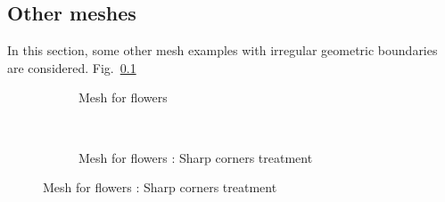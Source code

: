 \subsection{Other meshes}
In this section, some other mesh examples with irregular geometric boundaries are considered.
Fig.~\ref{}
\begin{figure}[h!]
    \begin{subfigure}[b]{1\linewidth}
        \centering
        \caption{Mesh for flowers}
    \end{subfigure}
    \\
    \begin{subfigure}[b]{1\linewidth}
        \centering
        \caption{Mesh for flowers : Sharp corners treatment}
    \end{subfigure}

\end{figure}

